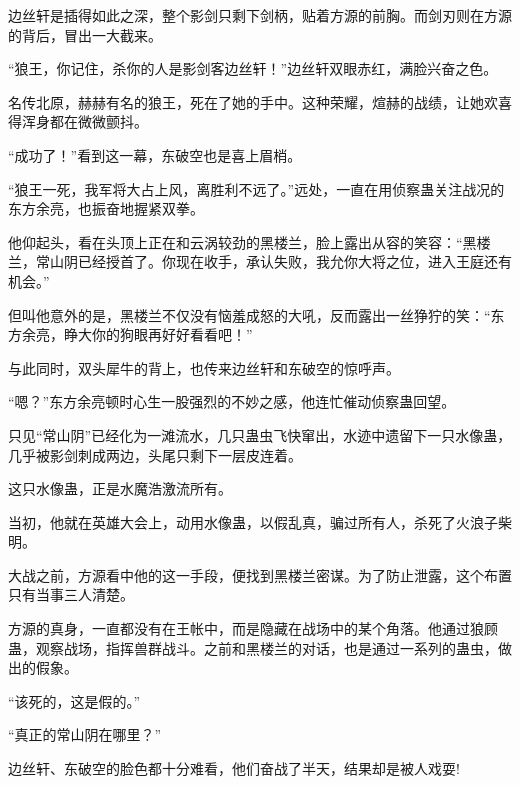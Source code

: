 \begin{this_body}
边丝轩是插得如此之深，整个影剑只剩下剑柄，贴着方源的前胸。而剑刃则在方源的背后，冒出一大截来。

“狼王，你记住，杀你的人是影剑客边丝轩！”边丝轩双眼赤红，满脸兴奋之色。

名传北原，赫赫有名的狼王，死在了她的手中。这种荣耀，煊赫的战绩，让她欢喜得浑身都在微微颤抖。

“成功了！”看到这一幕，东破空也是喜上眉梢。

“狼王一死，我军将大占上风，离胜利不远了。”远处，一直在用侦察蛊关注战况的东方余亮，也振奋地握紧双拳。

他仰起头，看在头顶上正在和云涡较劲的黑楼兰，脸上露出从容的笑容：“黑楼兰，常山阴已经授首了。你现在收手，承认失败，我允你大将之位，进入王庭还有机会。”

但叫他意外的是，黑楼兰不仅没有恼羞成怒的大吼，反而露出一丝狰狞的笑：“东方余亮，睁大你的狗眼再好好看看吧！”

与此同时，双头犀牛的背上，也传来边丝轩和东破空的惊呼声。

“嗯？”东方余亮顿时心生一股强烈的不妙之感，他连忙催动侦察蛊回望。

只见“常山阴”已经化为一滩流水，几只蛊虫飞快窜出，水迹中遗留下一只水像蛊，几乎被影剑刺成两边，头尾只剩下一层皮连着。

这只水像蛊，正是水魔浩激流所有。

当初，他就在英雄大会上，动用水像蛊，以假乱真，骗过所有人，杀死了火浪子柴明。

大战之前，方源看中他的这一手段，便找到黑楼兰密谋。为了防止泄露，这个布置只有当事三人清楚。

方源的真身，一直都没有在王帐中，而是隐藏在战场中的某个角落。他通过狼顾蛊，观察战场，指挥兽群战斗。之前和黑楼兰的对话，也是通过一系列的蛊虫，做出的假象。

“该死的，这是假的。”

“真正的常山阴在哪里？”

边丝轩、东破空的脸色都十分难看，他们奋战了半天，结果却是被人戏耍!

\end{this_body}


